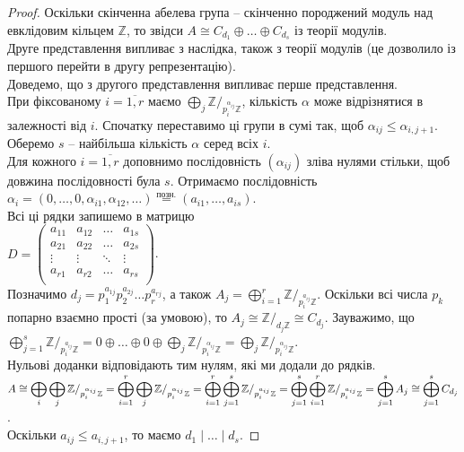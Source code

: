 \documentclass{math_library}
\begin{document}
\begin{proof}
Оскільки скінченна абелева група -- скінченно породжений модуль над евклідовим кільцем $\mathbb{Z}$, то звідси $A \cong C_{d_1} \oplus \dots \oplus C_{d_s}$ із теорії модулів.\\
Друге представлення випливає з наслідка, також з теорії модулів (це дозволило із першого перейти в другу репрезентацію).
\bigskip \\
Доведемо, що з другого представлення випливає перше представлення.\\
При фіксованому $i = \overline{1,r}$ маємо $\displaystyle\bigoplus_j \mathbb{Z}/_{p_i^{\alpha_{ij}} \mathbb{Z}}$, кількість $\alpha$ може відрізнятися в залежності від $i$. Спочатку переставимо ці групи в сумі так, щоб $\alpha_{ij} \leq \alpha_{i,j+1}$. Оберемо $s$ -- найбільша кількість $\alpha$ серед всіх $i$.\\
Для кожного $i = \overline{1,r}$ доповнимо послідовність $(\alpha_{ij})$ зліва нулями стільки, щоб довжина послідовності була $s$. Отримаємо послідовність $\alpha_i = (0,\dots,0,\alpha_{i1}, \alpha_{12}, \dots) \overset{\text{позн.}}{=} (a_{i1},\dots,a_{is})$. \\
Всі ці рядки запишемо в матрицю \\
$D = \begin{pmatrix}
a_{11} & a_{12} & \dots & a_{1s} \\
a_{21} & a_{22} & \dots & a_{2s} \\
\vdots & \vdots & \ddots & \vdots \\
a_{r1} & a_{r2} & \dots & a_{rs} \\
\end{pmatrix}$. \\
Позначимо $d_j = p_1^{a_{1j}} p_2^{a_{2j}} \dots p_r^{a_{rj}}$, а також $A_j = \displaystyle\bigoplus_{i=1}^r \mathbb{Z}/_{p_i^{a_{ij}} \mathbb{Z}}$. Оскільки всі числа $p_k$ попарно взаємно прості (за умовою), то $A_j \cong \mathbb{Z}/_{d_j \mathbb{Z}} \cong C_{d_j}$. Зауважимо, що\\
$\displaystyle\bigoplus_{j=1}^s \mathbb{Z}/_{p_i^{a_{ij}} \mathbb{Z}} = 0 \oplus \dots \oplus 0 \oplus \bigoplus_{j} \mathbb{Z}/_{p_i^{\alpha_{ij}} \mathbb{Z}} = \bigoplus_{j} \mathbb{Z}/_{p_i^{\alpha_{ij}} \mathbb{Z}}$.\\
Нульові доданки відповідають тим нулям, які ми додали до рядків.\\
$A \cong \displaystyle\bigoplus_i \bigoplus_{j} \mathbb{Z}/_{p_i^{\alpha_{ij}} \mathbb{Z}} = \displaystyle\bigoplus_{i=1}^r \bigoplus_{j} \mathbb{Z}/_{p_i^{\alpha_{ij}} \mathbb{Z}} = \bigoplus_{i=1}^r \bigoplus_{j=1}^s \mathbb{Z}/_{p_i^{a_{ij}} \mathbb{Z}} = \bigoplus_{j=1}^s \bigoplus_{i=1}^r \mathbb{Z}/_{p_i^{a_{ij}} \mathbb{Z}}  \\ = \bigoplus_{j=1}^s A_j \cong \bigoplus_{j=1}^s C_{d_j}$.\\
Оскільки $a_{ij} \leq a_{i,j+1}$, то маємо $d_1 \mid \dots \mid d_s$.
\end{proof}
\end{document}
